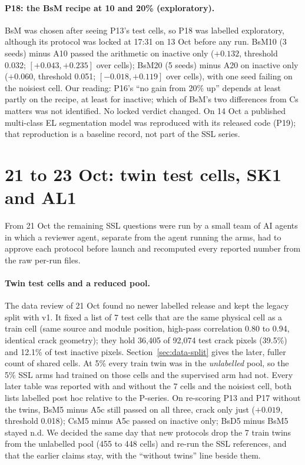 \paragraph{P18: the BsM recipe at 10 and 20\% (exploratory).} BsM was chosen after seeing P13's test cells, so P18 was labelled
exploratory, although its protocol was locked at 17:31 on 13 Oct before any run. BsM10 (3 seeds) minus A10 passed the arithmetic on
inactive only ($+0.132$, threshold 0.032; $[+0.043, +0.235]$ over cells); BsM20 (5 seeds) minus A20 on inactive only ($+0.060$,
threshold 0.051; $[-0.018, +0.119]$ over cells), with one seed failing on the noisiest cell. Our reading: P16's ``no gain from 20\% up''
depends at least partly on the recipe, at least for inactive; which of BsM's two differences from Cs matters was not identified. No
locked verdict changed. On 14 Oct a published multi-class EL segmentation model \citep{hanifi2025multiclass} was reproduced with its
released code (P19); that reproduction is a baseline record, not part of the SSL series.

\section{21 to 23 Oct: twin test cells, SK1 and AL1}\label{sec:pseries-al1}

From 21 Oct the remaining SSL questions were run by a small team of AI agents in which a reviewer agent, separate from the agent
running the arms, had to approve each protocol before launch and recomputed every reported number from the raw per-run files.

\paragraph{Twin test cells and a reduced pool.} The data review of 21 Oct found no newer labelled release and kept the legacy split
with v1. It fixed a list of 7 test cells that are the same physical cell as a train cell (same source and module position, high-pass
correlation 0.80 to 0.94, identical crack geometry); they hold 36,405 of 92,074 test crack pixels (39.5\%) and 12.1\% of test inactive
pixels. Section~\ref{sec:data-split} gives the later, fuller count of shared cells. At 5\% every train twin was in the
\emph{unlabelled} pool, so the 5\% SSL arms had trained on those cells and the supervised arm had not. Every later table was reported
with and without the 7 cells and the noisiest cell, both lists labelled post hoc relative to the P-series. On re-scoring P13 and P17
without the twins, BsM5 minus A5c still passed on all three, crack only just ($+0.019$, threshold 0.018); CsM5 minus A5c passed on
inactive only; BsD5 minus BsM5 stayed n.d. We decided the same day that new protocols drop the 7 train twins from the unlabelled pool
(455 to 448 cells) and re-run the SSL references, and that the earlier claims stay, with the ``without twins'' line beside them.

